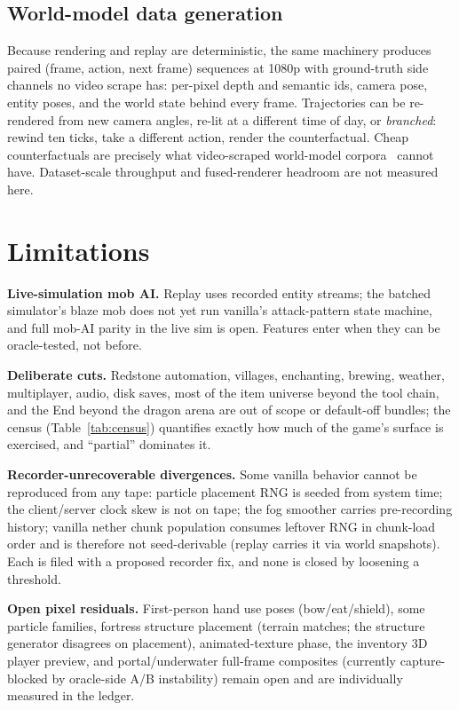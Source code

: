 \documentclass[11pt]{article}
\begin{document}
\subsection{World-model data generation}
\label{sec:worldmodel}

Because rendering and replay are deterministic, the same machinery produces paired (frame, action, next frame) sequences at 1080p with ground-truth side channels no video scrape has: per-pixel depth and semantic ids, camera pose, entity poses, and the world state behind every frame. Trajectories can be re-rendered from new camera angles, re-lit at a different time of day, or \emph{branched}: rewind ten ticks, take a different action, render the counterfactual. Cheap counterfactuals are precisely what video-scraped world-model corpora~\citep{baker2022vpt,hafner2023dreamerv3} cannot have. Dataset-scale throughput and fused-renderer headroom are not measured here.

\section{Limitations}
\label{sec:limits}

\textbf{Live-simulation mob AI.} Replay uses recorded entity streams; the batched simulator's blaze mob does not yet run vanilla's attack-pattern state machine, and full mob-AI parity in the live sim is open. Features enter when they can be oracle-tested, not before.

\textbf{Deliberate cuts.} Redstone automation, villages, enchanting, brewing, weather, multiplayer, audio, disk saves, most of the item universe beyond the tool chain, and the End beyond the dragon arena are out of scope or default-off bundles; the census (Table~\ref{tab:census}) quantifies exactly how much of the game's surface is exercised, and ``partial'' dominates it.

\textbf{Recorder-unrecoverable divergences.} Some vanilla behavior cannot be reproduced from any tape: particle placement RNG is seeded from system time; the client/server clock skew is not on tape; the fog smoother carries pre-recording history; vanilla nether chunk population consumes leftover RNG in chunk-load order and is therefore not seed-derivable (replay carries it via world snapshots). Each is filed with a proposed recorder fix, and none is closed by loosening a threshold.

\textbf{Open pixel residuals.} First-person hand use poses (bow/eat/shield), some particle families, fortress structure placement (terrain matches; the structure generator disagrees on placement), animated-texture phase, the inventory 3D player preview, and portal/underwater full-frame composites (currently capture-blocked by oracle-side A/B instability) remain open and are individually measured in the ledger.
\end{document}
